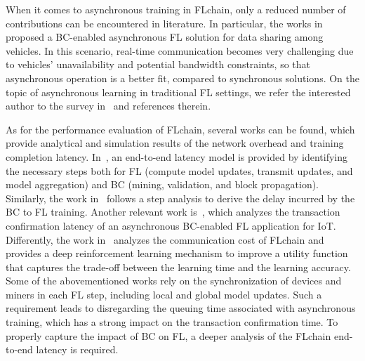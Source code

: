 \documentclass[10pt,journal,compsoc]{IEEEtran}
\begin{document}
When it comes to asynchronous training in FLchain, only a reduced number of contributions can be encountered in literature. In particular, the works in~\cite{lu2020blockchain, lu2020blockchain2} proposed a BC-enabled asynchronous FL solution for data sharing among vehicles. In this scenario, real-time communication becomes very challenging due to vehicles' unavailability and potential bandwidth constraints, so that asynchronous operation is a better fit, compared to synchronous solutions. On the topic of asynchronous learning in traditional FL settings, we refer the interested author to the survey in~\cite{xu2021asynchronous} and references therein.

As for the performance evaluation of FLchain, several works can be found, which provide analytical and simulation results of the network overhead and training completion latency. In~\cite{kim2019blockchained}, an end-to-end latency model is provided by identifying the necessary steps both for FL (compute model updates, transmit updates, and model aggregation) and BC (mining, validation, and block propagation). Similarly, the work in~\cite{pokhrel2020federated} follows a step analysis to derive the delay incurred by the BC to FL training. Another relevant work is~\cite{feng2021blockchain}, which analyzes the transaction confirmation latency of an asynchronous BC-enabled FL application for IoT. Differently, the work in~\cite{lu2020low} analyzes the communication cost of FLchain and provides a deep reinforcement learning mechanism to improve a utility function that captures the trade-off between the learning time and the learning accuracy. Some of the abovementioned works rely on the synchronization of devices and miners in each FL step, including local and global model updates. Such a requirement leads to disregarding the queuing time associated with asynchronous training, which has a strong impact on the transaction confirmation time. To properly capture the impact of BC on FL, a deeper analysis of the FLchain end-to-end latency is required. 
\end{document}
